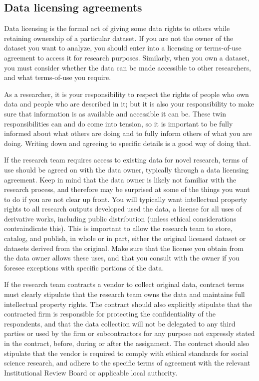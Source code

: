 \subsection{Data licensing agreements}

Data licensing is the formal act of giving some data rights to others
while retaining ownership of a particular dataset.
If you are not the owner of the dataset you want to analyze,
you should enter into a licensing or terms-of-use agreement to access it for research purposes.
Similarly, when you own a dataset,
you must consider whether the data can be made accessible to other researchers,
and what terms-of-use you require. 

As a researcher, it is your responsibility to respect the rights
of people who own data and people who are described in it;
but it is also your responsibility to make sure
that information is as available and accessible it can be.
These twin responsibilities can and do come into tension,
so it is important to be fully informed about what others are doing
and to fully inform others of what you are doing.
Writing down and agreeing to specific details is a good way of doing that.

If the research team requires access to existing data for novel research,
terms of use should be agreed on with the data owner, 
typically through a data licensing agreement.
Keep in mind that the data owner is likely not familiar
with the research process, and therefore may be surprised
at some of the things you want to do if you are not clear up front.
You will typically want intellectual property rights to all research outputs developed used the data,
a license for all uses of derivative works, including public distribution 
(unless ethical considerations contraindicate this).
This is important to allow the research team to store, catalog, and publish, in whole or in part,
either the original licensed dataset or datasets derived from the original.
Make sure that the license you obtain from the data owner allows these uses,
and that you consult with the owner if you foresee exceptions with specific portions of the data.

If the research team contracts a vendor to collect original data,
contract terms must clearly stipulate that the research team owns the data
and maintains full intellectual property rights. 
The contract should also explicitly stipulate that the contracted firm
is responsible for protecting the confidentiality of the respondents,
and that the data collection will not be delegated to any third parties
or used by the firm or subcontractors for any purpose not expressly stated in the contract,
before, during or after the assignment. 
The contract should also stipulate that the vendor is required to comply with 
ethical standards for social science research, 
and adhere to the specific terms of agreement with the relevant 
Institutional Review Board or applicable local authority. 

